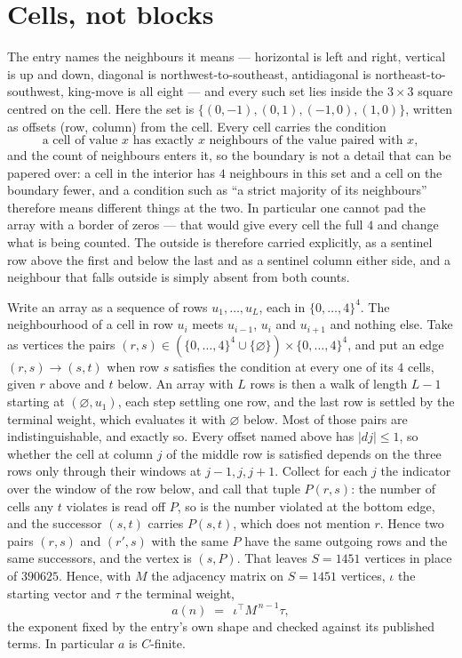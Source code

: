 \documentclass[11pt,a4paper]{article}
\theoremstyle{plain}
\theoremstyle{definition}
\begin{document}
\section{Cells, not blocks}

The entry names the neighbours it means --- horizontal is left and right, vertical is up and
down, diagonal is northwest-to-southeast, antidiagonal is northeast-to-southwest, king-move is
all eight --- and every such set lies inside the $3\times3$ square centred on the cell. Here
the set is $\{(0,-1), (0,1), (-1,0), (1,0)\}$, written as offsets (row, column) from the cell. Every cell carries
the condition
\[
\text{a cell of value }x\text{ has exactly }x\text{ neighbours of the value paired with }x,
\]
and the count of neighbours enters it, so the boundary is not a detail that can be papered
over: a cell in the interior has $4$ neighbours in this set and a cell on the boundary
fewer, and a condition such as ``a strict majority of its neighbours'' therefore means
different things at the two. In particular one cannot pad the array with a border of zeros ---
that would give every cell the full $4$ and change what is being counted. The outside is
therefore carried
explicitly, as a sentinel row above the first and below the last and as a sentinel column
either side, and a neighbour that falls outside is simply absent from both counts.

Write an array as a sequence of rows $u_1,\dots,u_L$, each in
$\{0,\dots,4\}^{4}$. The neighbourhood of a cell in row $u_i$ meets $u_{i-1}$,
$u_i$ and $u_{i+1}$ and nothing else. Take as vertices the pairs
$(r,s)\in(\{0,\dots,4\}^{4}\cup\{\varnothing\})\times\{0,\dots,4\}^{4}$,
and put an edge $(r,s)\to(s,t)$ when row $s$ satisfies the condition at every one of its
$4$ cells, given $r$ above and $t$ below. An array with $L$ rows is then a walk of length
$L-1$ starting at $(\varnothing,u_1)$, each step settling one row, and the last row is
settled by the terminal weight, which evaluates it with $\varnothing$ below. Most of those pairs are indistinguishable, and exactly so. Every offset named above has $|dj|\le 1$, so whether the cell at column $j$ of the middle row is satisfied depends on the three rows only through their windows at $j-1,j,j+1$. Collect for each $j$ the indicator over the window of the row below, and call that tuple $P(r,s)$: the number of cells any $t$ violates is read off $P$, so is the number violated at the bottom edge, and the successor $(s,t)$ carries $P(s,t)$, which does not mention $r$. Hence two pairs $(r,s)$ and $(r',s)$ with the same $P$ have the same outgoing rows and the same successors, and the vertex is $(s,P)$. That leaves $S=1451$ vertices in place of $390625$. Hence,
with $M$ the adjacency matrix on $S=1451$ vertices, $\iota$ the starting vector and $\tau$ the
terminal weight,
\[
a(n)\;=\;\,\iota^{\!\top}M^{\,n-1}\tau ,
\]
the exponent fixed by the entry's own shape and checked against its published terms. In
particular $a$ is $C$-finite.
\end{document}
